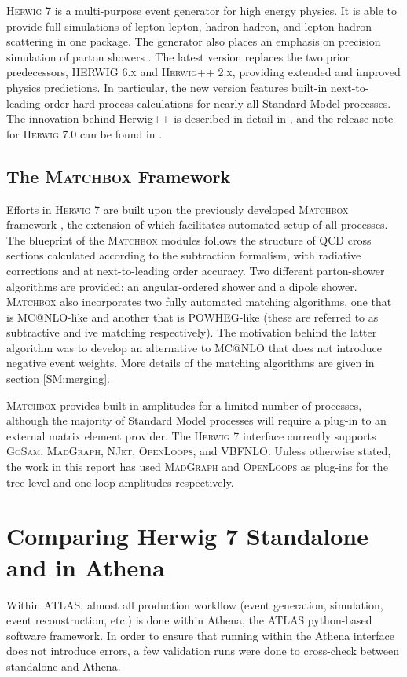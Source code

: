 \noindent \textsc{Herwig 7} is a multi-purpose event generator for high energy physics. It is able to provide full simulations of lepton-lepton, hadron-hadron, and lepton-hadron scattering in one package. The generator also places an emphasis on precision simulation of parton showers \cite{herwig-manual}. The latest version replaces the two prior predecessors, \textsc{HERWIG 6.x} and \textsc{Herwig++ 2.x}, providing extended and improved physics predictions. In particular, the new version features built-in next-to-leading order hard process calculations for nearly all Standard Model processes.  The innovation behind Herwig++ is described in detail in \cite{herwig-manual}, and the release  note for \textsc{Herwig 7.0} can be found in \cite{H70-release-note}. 

\subsection{The \textsc{Matchbox} Framework}
\noindent
Efforts in \textsc{Herwig 7} are built upon the previously developed \textsc{Matchbox} framework \cite{H70-release-note}, the extension of which facilitates automated setup of all processes. The blueprint of the \textsc{Matchbox} modules follows the structure of QCD cross sections calculated according to the subtraction formalism, with radiative corrections and at next-to-leading order accuracy. Two different parton-shower algorithms are provided: an angular-ordered shower and a dipole shower. \textsc{Matchbox} also incorporates two fully automated matching algorithms, one that is \textsc{MC@NLO}-like and another that is \textsc{POWHEG}-like (these are referred to as subtractive and ive matching respectively). The motivation behind the latter algorithm was to develop an alternative to \textsc{MC@NLO} that does not introduce negative event weights. More details of the matching algorithms are given in section \ref{SM:merging}.

\textsc{Matchbox} provides built-in amplitudes for a limited number of processes, although the majority of Standard Model processes will require a plug-in to an external matrix element provider. The \textsc{Herwig 7} interface currently supports \textsc{GoSam}, \textsc{MadGraph}, \textsc{NJet}, \textsc{OpenLoops}, and \textsc{VBFNLO}. Unless otherwise stated, the work in this report has used \textsc{MadGraph} and \textsc{OpenLoops} as plug-ins for the tree-level and one-loop amplitudes respectively. 

\section{Comparing Herwig 7 Standalone and in Athena}
\noindent
Within ATLAS, almost all production workflow (event generation, simulation, event reconstruction, etc.) is done within Athena, the ATLAS python-based software framework. In order to ensure that running  within the Athena interface does not introduce errors, a few validation runs were done to cross-check between  standalone and Athena. 

